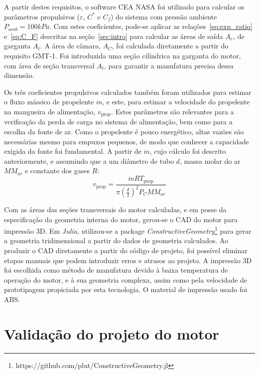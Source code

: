 A partir destes requisitos, o software CEA NASA foi utilizado para calcular os parâmetros propulsivos (\(\varepsilon \), \(C^\ast \) e \(C_f\)) do sistema com pressão ambiente \(P_{amb} = 100kPa\). Com estes coeficientes, pode-se aplicar as relações~\ref{eq:exp_ratio} e~\ref{eq:C_F} descritas na seção~\ref{sec:intro} para calcular as áreas de saída \(A_e\), de garganta \(A_t\). A área de câmara, \(A_C\), foi calculada diretamente a partir do requisito GMT-1. Foi introduzida uma seção cilíndrica na garganta do motor, com área de seção transversal \(A_t\), para garantir a manufatura precisa dessa dimensão.

Os três coeficientes propulsivos calculados também foram utilizados para estimar o fluxo mássico de propelente \(\dot{m}\), e este, para estimar a velocidade do propelente na mangueira de alimentação, \(v_{\text{prop}}\). Estes parâmetros são relevantes para a verificação da perda de carga no sistema de alimentação, bem como para a escolha da fonte de ar. Como o propelente é pouco energético, altas vazões são necessárias mesmo para empuxos pequenos, de modo que conhecer a capacidade exigida da fonte foi fundamental. A partir de \(\dot{m}\), cujo cálculo foi descrito anteriormente, e assumindo que a  um diâmetro de tubo \(d\), massa molar do ar \(MM_{ar}\) e constante dos gases \(R\):
\begin{equation}
    v_{\text{prop}} = \frac{\dot{m} R T_{\text{prop}}}{\pi \left(\frac{d}{2}\right)^2 P_C MM_{ar}}
\end{equation}

Com as áreas das seções transversais do motor calculadas, e em posse da especificação da geometria interna do motor, gerou-se o CAD do motor para impressão 3D. Em \textit{Julia}, utilizou-se a package \textit{ConstructiveGeometry}\footnote[1]{https://github.com/plut/ConstructiveGeometry.jl} para gerar a geometria tridimensional a partir do dados de geometria calculados. Ao produzir o CAD diretamente a partir do código de projeto, foi possível eliminar etapas manuais que podem introduzir erros e atrasos ao projeto. A impressão 3D foi escolhida como método de manufatura devido à baixa temperatura de operação do motor, e à sua geometria complexa, assim como pela velocidade de prototipagem propiciada por esta tecnologia. O material de impressão usado foi ABS.\@

\section{Validação do projeto do motor}

